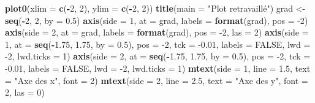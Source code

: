 \documentclass[]{article}
\newenvironment{Shaded}{\begin{snugshade}}{\end{snugshade}}
\newcommand{\DataTypeTok}[1]{\textcolor[rgb]{0.13,0.29,0.53}{#1}}
\newcommand{\DecValTok}[1]{\textcolor[rgb]{0.00,0.00,0.81}{#1}}
\newcommand{\FloatTok}[1]{\textcolor[rgb]{0.00,0.00,0.81}{#1}}
\newcommand{\KeywordTok}[1]{\textcolor[rgb]{0.13,0.29,0.53}{\textbf{#1}}}
\newcommand{\NormalTok}[1]{#1}
\newcommand{\OperatorTok}[1]{\textcolor[rgb]{0.81,0.36,0.00}{\textbf{#1}}}
\newcommand{\OtherTok}[1]{\textcolor[rgb]{0.56,0.35,0.01}{#1}}
\newcommand{\StringTok}[1]{\textcolor[rgb]{0.31,0.60,0.02}{#1}}
\begin{document}
\begin{Shaded}
\begin{Highlighting}[]
\KeywordTok{plot0}\NormalTok{(}\DataTypeTok{xlim =} \KeywordTok{c}\NormalTok{(}\OperatorTok{-}\DecValTok{2}\NormalTok{, }\DecValTok{2}\NormalTok{), }\DataTypeTok{ylim =} \KeywordTok{c}\NormalTok{(}\OperatorTok{-}\DecValTok{2}\NormalTok{, }\DecValTok{2}\NormalTok{))}
\KeywordTok{title}\NormalTok{(}\DataTypeTok{main =} \StringTok{"Plot retravaillé"}\NormalTok{)}
\NormalTok{grad <-}\StringTok{ }\KeywordTok{seq}\NormalTok{(}\OperatorTok{-}\DecValTok{2}\NormalTok{, }\DecValTok{2}\NormalTok{, }\DataTypeTok{by =} \FloatTok{0.5}\NormalTok{)}
\KeywordTok{axis}\NormalTok{(}\DataTypeTok{side =} \DecValTok{1}\NormalTok{, }\DataTypeTok{at =}\NormalTok{ grad, }\DataTypeTok{labels =} \KeywordTok{format}\NormalTok{(grad), }\DataTypeTok{pos =} \DecValTok{-2}\NormalTok{)}
\KeywordTok{axis}\NormalTok{(}\DataTypeTok{side =} \DecValTok{2}\NormalTok{, }\DataTypeTok{at =}\NormalTok{ grad, }\DataTypeTok{labels =} \KeywordTok{format}\NormalTok{(grad), }\DataTypeTok{pos =} \DecValTok{-2}\NormalTok{, }\DataTypeTok{las =} \DecValTok{2}\NormalTok{)}
\KeywordTok{axis}\NormalTok{(}\DataTypeTok{side =} \DecValTok{1}\NormalTok{, }\DataTypeTok{at =} \KeywordTok{seq}\NormalTok{(}\OperatorTok{-}\FloatTok{1.75}\NormalTok{, }\FloatTok{1.75}\NormalTok{, }\DataTypeTok{by =} \FloatTok{0.5}\NormalTok{), }\DataTypeTok{pos =} \DecValTok{-2}\NormalTok{, }\DataTypeTok{tck =} \FloatTok{-0.01}\NormalTok{, }\DataTypeTok{labels =} \OtherTok{FALSE}\NormalTok{, }\DataTypeTok{lwd =} \DecValTok{-2}\NormalTok{, }\DataTypeTok{lwd.ticks =} \DecValTok{1}\NormalTok{)}
\KeywordTok{axis}\NormalTok{(}\DataTypeTok{side =} \DecValTok{2}\NormalTok{, }\DataTypeTok{at =} \KeywordTok{seq}\NormalTok{(}\OperatorTok{-}\FloatTok{1.75}\NormalTok{, }\FloatTok{1.75}\NormalTok{, }\DataTypeTok{by =} \FloatTok{0.5}\NormalTok{), }\DataTypeTok{pos =} \DecValTok{-2}\NormalTok{, }\DataTypeTok{tck =} \FloatTok{-0.01}\NormalTok{, }\DataTypeTok{labels =} \OtherTok{FALSE}\NormalTok{, }\DataTypeTok{lwd =} \DecValTok{-2}\NormalTok{, }\DataTypeTok{lwd.ticks =} \DecValTok{1}\NormalTok{)}
\KeywordTok{mtext}\NormalTok{(}\DataTypeTok{side =} \DecValTok{1}\NormalTok{, }\DataTypeTok{line =} \FloatTok{1.5}\NormalTok{, }\DataTypeTok{text =} \StringTok{"Axe des x"}\NormalTok{, }\DataTypeTok{font =} \DecValTok{2}\NormalTok{)}
\KeywordTok{mtext}\NormalTok{(}\DataTypeTok{side =} \DecValTok{2}\NormalTok{, }\DataTypeTok{line =} \FloatTok{2.5}\NormalTok{, }\DataTypeTok{text =} \StringTok{"Axe des y"}\NormalTok{, }\DataTypeTok{font =} \DecValTok{2}\NormalTok{, }\DataTypeTok{las =} \DecValTok{0}\NormalTok{)}
\end{Highlighting}
\end{Shaded}
\end{document}
